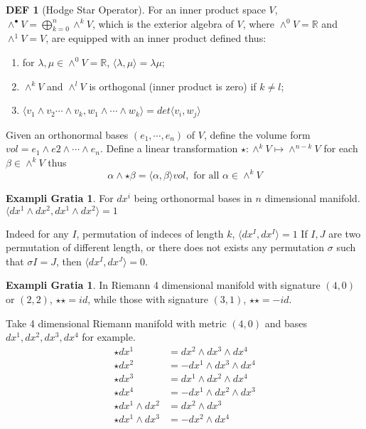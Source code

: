 \documentclass[twocolumn]{article}
\newcommand{\R}{\mathbb{R}}
\theoremstyle{definition}
\newtheorem{example}[thm]{Exampli Gratia}
\newtheorem{defi}[thm]{DEF}
\begin{document}
\begin{defi}[Hodge Star Operator]
	For an inner product space $V$, $\wedge^{\bullet}V = \bigoplus^n_{k=0} \wedge^k V$, which is the exterior algebra of $V$, where $\wedge^0 V = \R$ and $\wedge^1 V = V$, are equipped with an inner product defined thus:
	\begin{enumerate}
		\item for $\lambda, \mu \in \wedge^0 V = \R$, $\langle \lambda, \mu \rangle = \lambda \mu$;
		\item $\wedge^k V$ and $\wedge^l V$ is orthogonal (inner product is zero) if $k \neq l$;
		\item $\langle v_1 \wedge v_2 \cdots \wedge v_k, w_1 \wedge \cdots \wedge w_k \rangle = det\langle v_i, w_j \rangle$
	\end{enumerate}
	Given an orthonormal bases $(e_1, \cdots, e_n)$ of $V$, define the volume form $vol = e_1\wedge e2 \wedge \cdots \wedge e_n$. 
	Define a linear transformation $\star: \wedge^k V \mapsto \wedge^{n-k}V$ for each $\beta \in \wedge^{k} V$ thus
	$$
	\alpha \wedge \star \beta = \langle \alpha, \beta \rangle vol, \text{ for all } \alpha \in \wedge^{k} V
	$$
\end{defi}

\begin{example}
	For $dx^i$ being orthonormal bases in $n$ dimensional manifold.
	$\langle dx^1 \wedge dx^2, dx^1 \wedge dx^2 \rangle = 1$

	Indeed for any $I$, permutation of indeces of length $k$,
	$\langle dx^I , dx^I \rangle = 1$
	If $I,J$ are two permutation of different length, or there does not exists any permutation $\sigma$ such that $\sigma I = J$, then $\langle dx^I, dx^J \rangle = 0$.
\end{example}
\begin{example}
In Riemann 4 dimensional manifold with signature $(4, 0)$ or $(2,2)$, $\star \star = id$, while those with signature $(3,1)$, $\star \star = - id$.

Take 4 dimensional Riemann manifold with metric $(4,0)$ and bases $dx^1, dx^2, dx^3, dx^4$ for example.
\begin{align*}
	\star dx^1 &= dx^2 \wedge dx^3 \wedge dx^4 \\
	\star dx^2 &= - dx^1 \wedge dx^3 \wedge dx^4 \\
	\star dx^3 &=  dx^1 \wedge dx^2 \wedge dx^4 \\
	\star dx^4 &= - dx^1 \wedge dx^2 \wedge dx^3 \\
	\star dx^1 \wedge dx^2 &=  dx^2 \wedge dx^3 \\
	\star dx^1 \wedge dx^3 &=  - dx^2 \wedge dx^4 \\
\end{align*}

\end{example}
\end{document}
